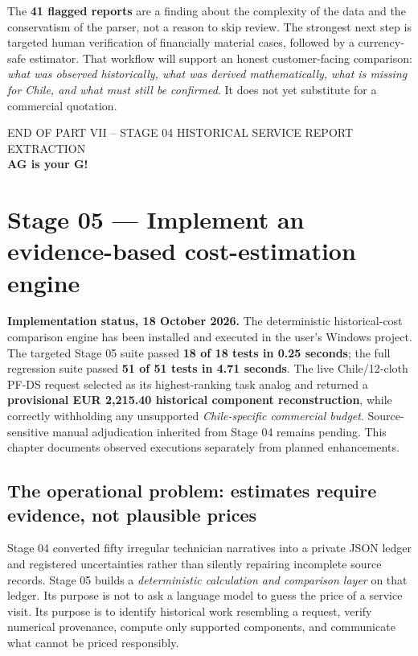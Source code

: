 \documentclass[11pt,a4paper]{article}
\DeclareRobustCommand{\code}[1]{{\ttfamily\small\detokenize{#1}}}
\begin{document}
The \textbf{41 flagged reports} are a finding about the complexity of the data and the conservatism of the parser, not a reason to skip review. The strongest next step is targeted human verification of financially material cases, followed by a currency-safe \code{Decimal} estimator. That workflow will support an honest customer-facing comparison: \emph{what was observed historically, what was derived mathematically, what is missing for Chile, and what must still be confirmed}. It does not yet substitute for a commercial quotation.

\vspace{4mm}
\begin{center}
{\sffamily\color{Gray}\footnotesize END OF PART VII -- STAGE 04 HISTORICAL SERVICE REPORT EXTRACTION}\\[2mm]
{\sffamily\bfseries\color{Navy}AG is your G!}
\end{center}


\clearpage
\section{Stage 05 --- Implement an evidence-based cost-estimation engine}
\begin{keybox}
\textbf{Implementation status, 18 October 2026.} The deterministic historical-cost comparison engine has been installed and executed in the user's Windows project. The targeted Stage 05 suite passed \textbf{18 of 18 tests in 0.25 seconds}; the full regression suite passed \textbf{51 of 51 tests in 4.71 seconds}. The live Chile/12-cloth PF-DS request selected \code{FSR-0027} as its highest-ranking task analog and returned a \textbf{provisional EUR 2,215.40 historical component reconstruction}, while correctly withholding any unsupported \emph{Chile-specific commercial budget}. Source-sensitive manual adjudication inherited from Stage 04 remains pending. This chapter documents observed executions separately from planned enhancements.
\end{keybox}

\subsection{The operational problem: estimates require evidence, not plausible prices}
Stage 04 converted fifty irregular technician narratives into a private JSON ledger and registered uncertainties rather than silently repairing incomplete source records. Stage 05 builds a \emph{deterministic calculation and comparison layer} on that ledger. Its purpose is not to ask a language model to guess the price of a service visit. Its purpose is to identify historical work resembling a request, verify numerical provenance, compute only supported components, and communicate what cannot be priced responsibly.
\end{document}

